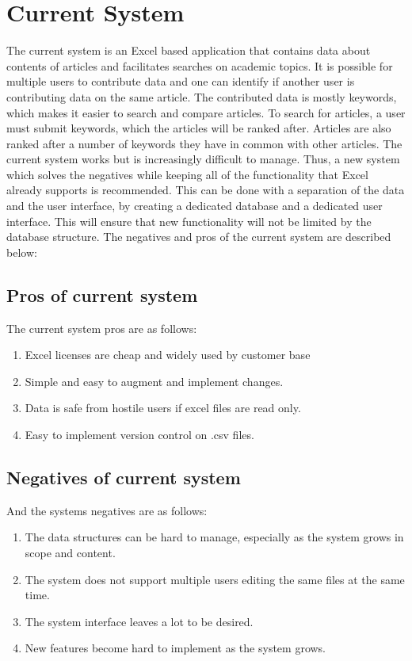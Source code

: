 \section{Current System}
The current system is an Excel based application that contains data about contents of articles and facilitates searches on academic topics. It is possible for multiple users to contribute data and one can identify if another user is contributing data on the same article. The contributed data is mostly keywords, which makes it easier to search and compare articles. To search for articles, a user must submit keywords, which the articles will be ranked after. Articles are also ranked after a number of keywords they have in common with other articles. The current system works but is increasingly difficult to manage. Thus, a new system which solves the negatives while keeping all of the functionality that Excel already supports is recommended. This can be done with a separation of the data and the user interface, by creating a dedicated database and a dedicated user interface. This will ensure that new functionality will not be limited by the database structure. The negatives and pros of the current system are described below:

\subsection{Pros of current system}
The current system pros are as follows:

\begin{enumerate}
	\item Excel licenses are cheap and widely used by customer base
	\item Simple and easy to augment and implement changes.
	\item Data is safe from hostile users if excel files are read only. 
	\item Easy to implement version control on .csv files. 
\end{enumerate}

\subsection{Negatives of current system} 
And the systems negatives are as follows: 

\begin{enumerate}
	\item The data structures can be hard to manage, especially as the system grows in scope and content.
	\item The system does not support multiple users editing the same files at the same time.
	\item The system interface leaves a lot to be desired.
	\item New features become hard to implement as the system grows.
\end{enumerate}
